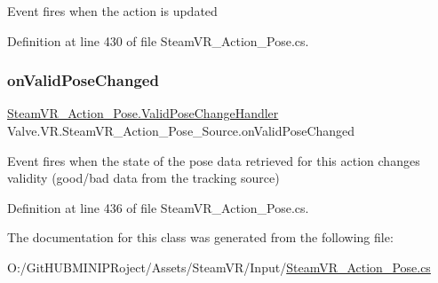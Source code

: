 Event fires when the action is updated 



Definition at line 430 of file Steam\+V\+R\+\_\+\+Action\+\_\+\+Pose.\+cs.

\mbox{\label{class_valve_1_1_v_r_1_1_steam_v_r___action___pose___source_a0fbc1433f2809fe24d2581f5f326a6e2}} 
\subsubsection{\texorpdfstring{onValidPoseChanged}{onValidPoseChanged}}
{\footnotesize\ttfamily \mbox{\hyperlink{class_valve_1_1_v_r_1_1_steam_v_r___action___pose_a742270a6bddfea2afd7f535378ae7830}{Steam\+V\+R\+\_\+\+Action\+\_\+\+Pose.\+Valid\+Pose\+Change\+Handler}} Valve.\+V\+R.\+Steam\+V\+R\+\_\+\+Action\+\_\+\+Pose\+\_\+\+Source.\+on\+Valid\+Pose\+Changed}



Event fires when the state of the pose data retrieved for this action changes validity (good/bad data from the tracking source) 



Definition at line 436 of file Steam\+V\+R\+\_\+\+Action\+\_\+\+Pose.\+cs.



The documentation for this class was generated from the following file\+:\begin{DoxyCompactItemize}
\item 
O\+:/\+Git\+H\+U\+B\+M\+I\+N\+I\+P\+Roject/\+Assets/\+Steam\+V\+R/\+Input/\mbox{\hyperlink{_steam_v_r___action___pose_8cs}{Steam\+V\+R\+\_\+\+Action\+\_\+\+Pose.\+cs}}\end{DoxyCompactItemize}

